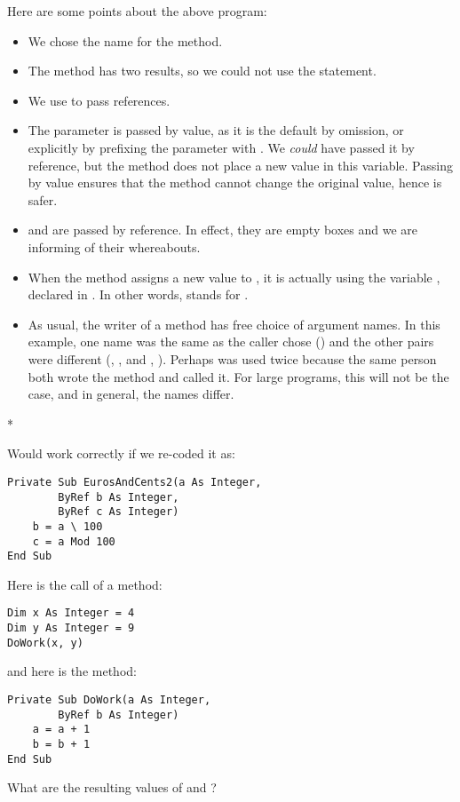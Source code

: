		Here are some points about the above program:
		\begin{itemize}
			\item We chose the name  for the method.
			\item The method has two results, so we could not use the  statement.
			\item We use  to pass references.
			\item The  parameter is passed by value, as it is the default by omission, or explicitly by prefixing the parameter with . We \emph{could} have passed it by reference, but the method does not place a new value in this variable. Passing by value ensures that the method cannot change the original value, hence is safer.
			\item {} and  are passed by reference. In effect, they are empty boxes and we are informing  of their whereabouts.
			\item When the method assigns a new value to , it is actually using the variable , declared in . In other words,  stands for .
			\item As usual, the writer of a method has free choice of argument names. In this example, one name was the same as the caller chose () and the other pairs were different (, , and , ). Perhaps  was used twice because the same person both wrote the method and called it. For large programs, this will not be the case, and in general, the names differ.
		\end{itemize}


		\begin{stqb}*
			\begin{STQ}
				\item	Would  work correctly if we re-coded it as:
					\begin{lstlisting}
Private Sub EurosAndCents2(a As Integer,
		ByRef b As Integer,
		ByRef c As Integer)
	b = a \ 100
	c = a Mod 100
End Sub
					\end{lstlisting}
				\item 	Here is the call of a method:
					\begin{lstlisting}
Dim x As Integer = 4
Dim y As Integer = 9
DoWork(x, y)
					\end{lstlisting}
					and here is the method:
					\begin{lstlisting}
Private Sub DoWork(a As Integer,
		ByRef b As Integer)
	a = a + 1
	b = b + 1
End Sub
					\end{lstlisting}
					What are the resulting values of  and ?
			\end{STQ}
		\end{stqb}

